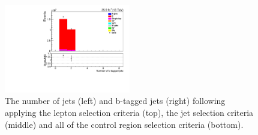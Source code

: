 \begin{figure}[ht]
\includegraphics[width=0.49\textwidth]{figs/background-estimation/plots/unblinded/ttbar_control/numbBJets_SingleTop_wMass_emu.pdf}
\caption{
The number of jets (left) and b-tagged jets (right) following applying the lepton selection criteria (top), the jet selection criteria (middle) and all of the \ttbar control region selection criteria (bottom).
}
\label{fig:App_ttbar_nJets}
\end{figure}

